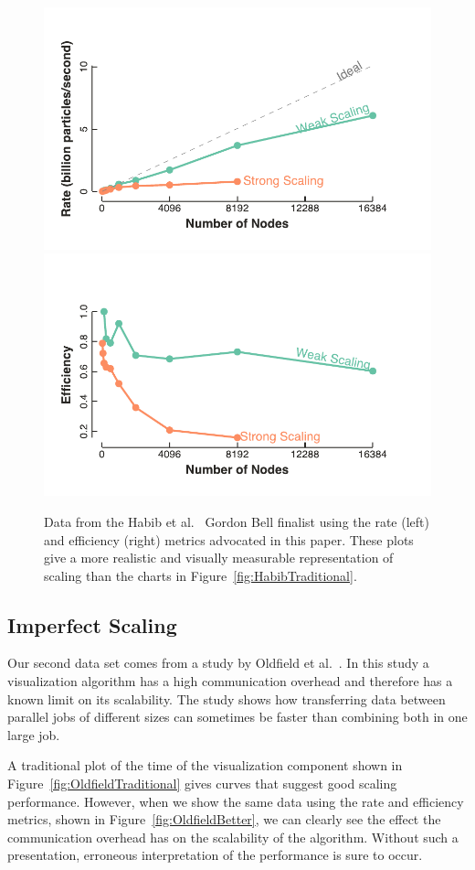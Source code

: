 \documentclass{llncs}
\newcommand*{\scite}[1]{~\cite{#1}}
\newcommand{\etal}{et al.\xspace}
\begin{document}
\begin{figure}[htb]
  \centering
  \includegraphics[width=.48\linewidth]{images/HabibRate}\quad
  \includegraphics[width=.48\linewidth]{images/HabibEfficiency}
  \caption{Data from the Habib \etal\scite{Habib2013} Gordon Bell finalist
    using the rate (left) and efficiency (right) metrics advocated in this
    paper. These plots give a more realistic and visually measurable
    representation of scaling than the charts in
    Figure~\ref{fig:HabibTraditional}.}
  \label{fig:HabibBetter}
\end{figure}


\subsection{Imperfect Scaling}

\noindent
Our second data set comes from a study by Oldfield
\etal\scite{Oldfield2014}. In this study a visualization
algorithm has a high communication overhead and therefore has a known limit
on its scalability. The study shows how transferring data between parallel
jobs of different sizes can sometimes be faster than combining both in one
large job.

A traditional plot of the time of the visualization component shown in
Figure~\ref{fig:OldfieldTraditional} gives curves that suggest good scaling
performance. However, when we show the same data using the rate and
efficiency metrics, shown in Figure~\ref{fig:OldfieldBetter}, we can
clearly see the effect the communication overhead has on the scalability of
the algorithm. Without such a presentation, erroneous interpretation of the
performance is sure to occur.
\end{document}
